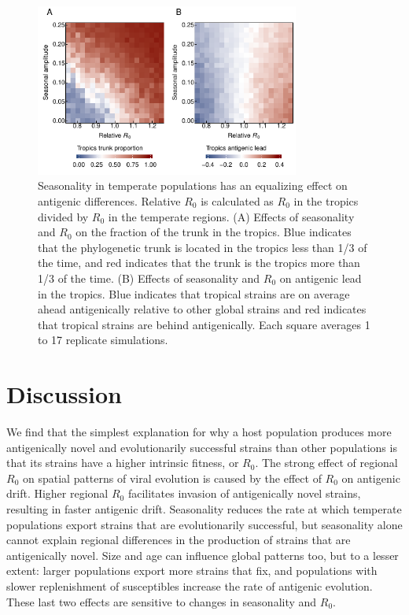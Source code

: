 \documentclass[10pt]{article}
\begin{document}
\begin{figure}[h!]
\centerline{\includegraphics[width=3.42in]{./manuscript/figures/seasonality_relativeR0/seasonality_relativeR0.pdf}}
\caption{Seasonality in temperate populations has an equalizing effect on antigenic differences. 
Relative $R_0$ is calculated as $R_0$ in the tropics divided by $R_0$ in the temperate regions. 
(A) Effects of seasonality and $R_0$ on the fraction of the trunk in the tropics. 
Blue indicates that the phylogenetic trunk is located in the tropics less than 1/3 of the time, and red indicates that the trunk is the tropics more than 1/3 of the time. 
(B) Effects of seasonality and $R_0$ on antigenic lead in the tropics. Blue indicates that tropical strains are on average ahead antigenically relative to other global strains and red indicates that tropical strains are behind antigenically. 
Each square averages 1 to 17 replicate simulations.}
\label{fig:seasonality_relativeR0}
\end{figure}

\section{Discussion} 

We find that the simplest explanation for why a host population produces more antigenically novel and evolutionarily successful strains than other populations is that its strains have a higher intrinsic fitness, or $R_0$. 
The strong effect of regional $R_0$ on spatial patterns of viral evolution is caused by the effect of $R_0$ on antigenic drift. 
Higher regional $R_0$ facilitates invasion of antigenically novel strains, resulting in faster antigenic drift.
Seasonality reduces the rate at which temperate populations export strains that are evolutionarily successful, but seasonality alone cannot explain regional differences in the production of strains that are antigenically novel. 
Size and age can influence global patterns too, but to a lesser extent: larger populations export more strains that fix, and populations with slower replenishment of susceptibles increase the rate of antigenic evolution. 
These last two effects are sensitive to changes in seasonality and $R_0$. 
\end{document}
